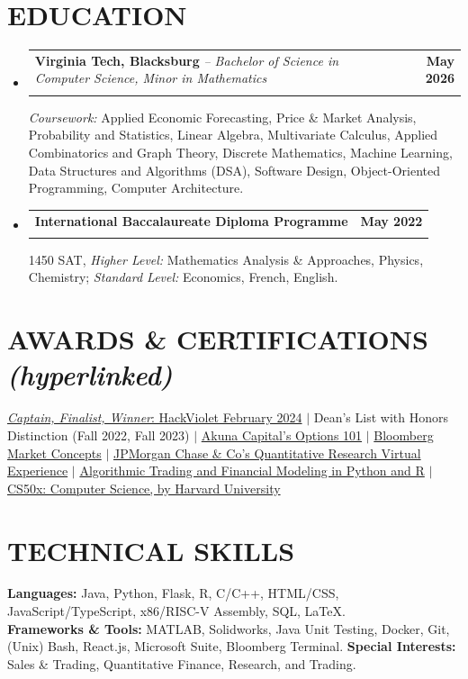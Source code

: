 \documentclass[letterpaper,10pt]{article}
\makeatletter
\newcommand{\resumeSubheadingTwo}[4]{
  \vspace{-3pt}\item
    \begin{tabular*}{1\textwidth}[t]{l@{\extracolsep{\fill}}r}
      {#1} & #2 \\
      {#3} & \textit{ #4} \\
    \end{tabular*}\vspace{-11pt}
}
\newcommand{\resumeSubheadingOne}[4]{
  \vspace{-2pt}\item
    \begin{tabular*}{1\textwidth}[t]{l@{\extracolsep{\fill}}r}
      {#1} & #2 \\
      {#3} & \textit{ #4} \\
    \end{tabular*}\vspace{-11pt}
}
\newcommand{\resumeSubHeadingListStart}{\begin{itemize}[leftmargin=0in, label={}]}
\newcommand{\resumeSubHeadingListEnd}{\end{itemize}}
\makeatother
\begin{document}
\section{\bf EDUCATION}
  \resumeSubHeadingListStart
    \resumeSubheadingOne
      {\textbf{Virginia Tech, Blacksburg} \textit{-- Bachelor of Science in Computer Science, Minor in Mathematics}}{\textbf{May 2026}}
      {}{}
      \textit{Coursework:} Applied Economic Forecasting, Price \& Market Analysis, Probability and Statistics, Linear Algebra, Multivariate Calculus, Applied Combinatorics and Graph Theory, Discrete Mathematics, Machine Learning, Data Structures and Algorithms (DSA), Software Design, Object-Oriented Programming, Computer Architecture.
     \resumeSubheadingTwo
      {\textbf{International Baccalaureate Diploma Programme}}{\textbf{May 2022}}
      {}{}
      1450 SAT, \textit{Higher Level:} Mathematics Analysis \& Approaches, Physics, Chemistry; \textit{Standard Level:} Economics, French, English.\\
  \resumeSubHeadingListEnd

%
\section[Certifications]{\bf AWARDS \& CERTIFICATIONS \hfill {\small\textit{(hyperlinked)}}}
\href{https://devpost.com/software/flink-la94iy}{\textit{Captain, Finalist, Winner}: HackViolet February 2024} $|$ Dean's List with Honors Distinction (Fall 2022, Fall 2023) $|$ \href{https://akunacapital.teachable.com/}{Akuna Capital's Options 101} $|$ \href{https://www.bloomberg.com/professional/product/certificate-courses/}{Bloomberg Market Concepts} $|$ \href{https://forage-uploads-prod.s3.amazonaws.com/completion-certificates/J.P.%20Morgan/bWqaecPDbYAwSDqJy_JPMorgan%20Chase%20&%20Co._yiENqwmegcvLLrcof_1696617313941_completion_certificate.pdf}{JPMorgan Chase \& Co's Quantitative Research Virtual Experience} $|$ \href{https://www.linkedin.com/learning/certificates/6b32064a65c28b6a5719cc6ee4f55cd4315226c11fb25f73d3922fac0ffb84ce}{Algorithmic Trading and Financial Modeling in Python and R} $|$ \href{https://courses.edx.org/certificates/b35551102c414aceba8f412c511ab4cb}{CS50x: Computer Science, by Harvard University}

%
\section[Technical Skills]{\bf TECHNICAL SKILLS}
 \textbf{Languages:} Java, Python, Flask, R, C/C++, HTML/CSS, JavaScript/TypeScript, x86/RISC-V Assembly, SQL, \LaTeX. \\
 \textbf{Frameworks \& Tools:} MATLAB, Solidworks, Java Unit Testing, Docker, Git, (Unix) Bash, React.js, Microsoft Suite, Bloomberg Terminal.
 \textbf{Special Interests:}
Sales \& Trading, Quantitative Finance, Research, and Trading. 
 \\
\end{document}
